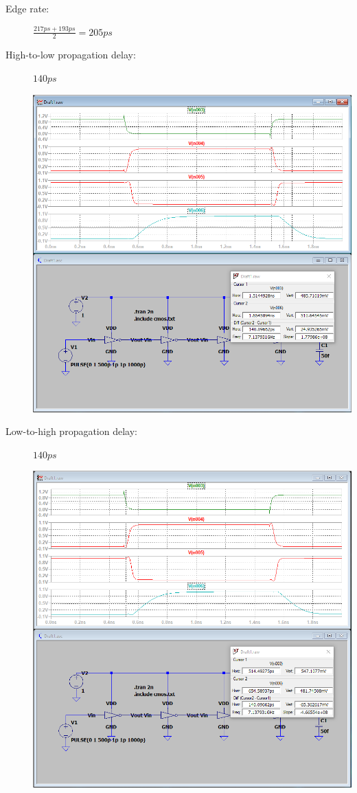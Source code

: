 \documentclass[a4paper, 11pt]{article}
\begin{document}
\begin{description}
\begin{center}
	      \end{center}
	\item[Edge rate:] $\frac{217ps + 193ps}{2} = 205ps$
	      \pagebreak
	\item[High-to-low propagation delay:] $140ps$ \hfill
	      \begin{center}
		      \includegraphics[scale=0.38]{mikro_lab3/high_to_low3.PNG}
	      \end{center}
	\item[Low-to-high propagation delay:] $140ps$ \hfill
	      \begin{center}
		      \includegraphics[scale=0.38]{mikro_lab3/low_to_high3.PNG}

\end{center}
\end{description}
\end{document}
